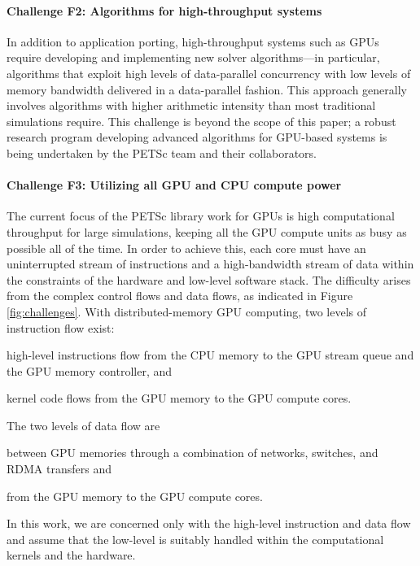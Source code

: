 \documentclass[10pt,journal,compsoc]{IEEEtran}
\newenvironment{titemize} %
        {\begin{list}{\labelitemi}{
                \setlength{\topsep}{0pt}
                \setlength{\parskip}{0pt}
                \setlength{\itemsep}{0pt}
                \setlength{\parsep}{0pt}
                \setlength{\leftmargin}{23pt}
                \setlength{\labelwidth}{23pt}
        }}
        {\end{list}}
\begin{document}
\paragraph{Challenge F2: Algorithms for high-throughput systems}

In addition to application porting, high-throughput systems such as GPUs require developing and implementing new solver algorithms---in particular, algorithms that exploit high levels of
data-parallel concurrency with  low levels of memory bandwidth delivered in a data-parallel fashion. This approach
generally involves algorithms with higher arithmetic intensity than most traditional simulations require.
This challenge is beyond the scope of this paper;  a robust research program developing advanced algorithms for GPU-based systems is being undertaken by the PETSc team and their collaborators.

\paragraph{Challenge F3: Utilizing all GPU and CPU compute power}


The current focus of the PETSc library work for GPUs is high computational throughput for large simulations,
keeping all the GPU compute units as busy as possible all of the time. 
In order to achieve this, each core must have an uninterrupted stream of instructions and a high-bandwidth stream of data within the constraints of the hardware
and low-level software stack.
The difficulty arises from the complex control flows and data flows, as indicated in Figure \ref{fig:challenges}. With distributed-memory GPU computing, two levels
of instruction flow exist:
\begin{titemize}
\item high-level instructions flow from the CPU memory to the GPU stream queue and the GPU memory controller, and
\item kernel code flows from the GPU memory to the GPU compute cores.
\end{titemize}
The two levels of data flow are
\begin{titemize}
\item between GPU memories through a combination of networks, switches, and RDMA transfers and
\item from the GPU memory to the GPU compute cores.
\end{titemize}
In this work, we are concerned only with the high-level instruction and data flow and assume that the low-level is suitably handled within the computational kernels and the hardware.
\end{document}

